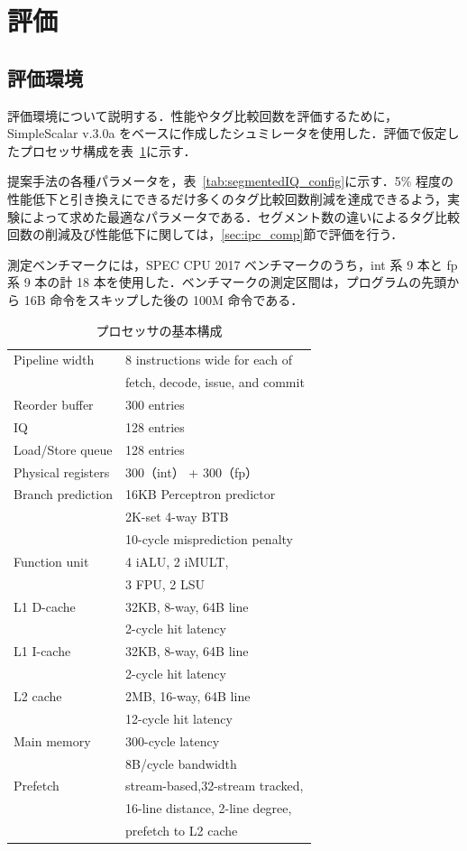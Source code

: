 \documentclass[submit,techrep,noauthor]{ipsj}
\newcommand{\tab}[1]{{表~\ref{tab:#1}}}
\begin{document}
\section{評価}
\label{sec:eval}
\subsection{評価環境}
評価環境について説明する．性能やタグ比較回数を評価するために，SimpleScalar v.3.0a をベースに作成したシュミレータを使用した．評価で仮定したプロセッサ構成を\tab{base_config}に示す．

提案手法の各種パラメータを，\tab{segmentedIQ_config}に示す．5\% 程度の性能低下と引き換えにできるだけ多くのタグ比較回数削減を達成できるよう，実験によって求めた最適なパラメータである．セグメント数の違いによるタグ比較回数の削減及び性能低下に関しては，\ref{sec:ipc_comp}節で評価を行う．

測定ベンチマークには，SPEC CPU 2017 ベンチマークのうち，int 系 9 本と fp 系 9 本の計 18 本を使用した．ベンチマークの測定区間は，プログラムの先頭から 16B 命令をスキップした後の 100M 命令である．

\begin{table}[htb]
  \caption{プロセッサの基本構成}
  \footnotesize
  \center
    \begin{tabular}{l|l} \hline \hline
     Pipeline width & 8 instructions wide for each of \\
     & fetch, decode, issue, and commit \\
     Reorder buffer & 300 entries \\
     IQ & 128 entries \\
     Load/Store queue & 128 entries \\
     Physical registers & 300（int） + 300（fp） \\
     Branch prediction & 16KB Perceptron predictor~\cite{Jimenez2001} \\
     & 2K-set 4-way BTB \\
     & 10-cycle misprediction penalty \\
     Function unit & 4 iALU, 2 iMULT, \\
     &  3 FPU, 2 LSU \\
     L1 D-cache & 32KB, 8-way, 64B line \\
      & 2-cycle hit latency \\
     L1 I-cache & 32KB, 8-way, 64B line \\
      &  2-cycle hit latency \\
     L2 cache & 2MB, 16-way, 64B line \\
      & 12-cycle hit latency \\  
     Main memory & 300-cycle latency \\
     & 8B/cycle bandwidth \\ 
     Prefetch & stream-based,32-stream tracked,  \\ 
     & 16-line distance, 2-line degree, \\
     & prefetch to L2 cache \\ \hline
  \end{tabular}
  \label{tab:base_config}
\end{table}
\end{document}
